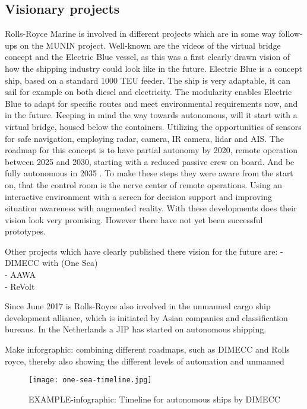 \subsection{Visionary projects} 
Rolls-Royce Marine is involved in different projects which are in some way follow-ups on the MUNIN project. Well-known are the videos of the virtual bridge concept and the Electric Blue vessel, as this was a first clearly drawn vision of how the shipping industry could look like in the future. Electric Blue is a concept ship, based on a standard 1000 \ac{TEU} feeder. The ship is very adaptable, it can sail for example on both diesel and electricity. The modularity enables Electric Blue to adapt for specific routes and meet environmental requirements now, and in the future. 
Keeping in mind the way towards autonomous, will it start with a virtual bridge, housed below the containers. Utilizing the opportunities of sensors for safe navigation, employing radar, camera, IR camera, lidar and \ac{AIS}. The roadmap for this concept is to have partial autonomy by 2020, remote operation between 2025 and 2030, starting with a reduced passive crew on board. And be fully autonomous in 2035 \cite{Wilson2017}. 
To make these steps they were aware from the start on, that the control room is the nerve center of remote operations. Using an interactive environment with a screen for decision support and improving situation awareness with augmented reality. With these developments does their vision look very promising. However there have not yet been successful prototypes.

Other projects which have clearly published there vision for the future are:
- DIMECC with (One Sea)\\
- AAWA\\
- ReVolt\\

Since June 2017 is Rolls-Royce also involved in the unmanned cargo ship development alliance, which is initiated by Asian companies and classification bureaus.
In the Netherlands a \ac{JIP} has started on autonomous shipping.

Make inforgraphic: combining different roadmaps, such as DIMECC and Rolls royce, thereby also showing the different levels of automation and unmanned

\begin{figure}[b]
	\centering
	\texttt{[image: one-sea-timeline.jpg]}
	\caption{EXAMPLE-infographic: Timeline for autonomous ships by DIMECC}
	\label{fig:time-line-autonomous}
\end{figure}


